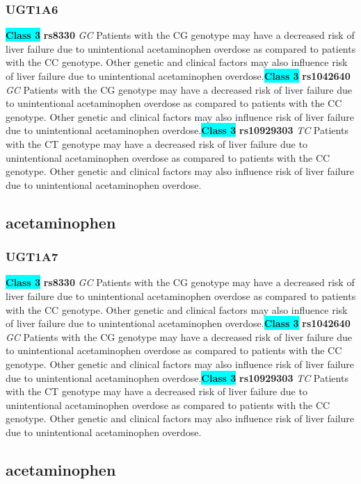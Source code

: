 \documentclass{book}
\begin{document}
\subsubsection{ UGT1A6 }

\begin{center}
\textbf{\colorbox{cyan} {Class 3}} \textbf{ rs8330 } \textit{ GC }
Patients with the CG genotype may have a decreased risk of liver failure due to unintentional acetaminophen overdose as compared to patients with the CC genotype. Other genetic and clinical factors may also influence risk of liver failure due to unintentional acetaminophen overdose.\textbf{\colorbox{cyan} {Class 3}} \textbf{ rs1042640 } \textit{ GC }
Patients with the CG genotype may have a decreased risk of liver failure due to unintentional acetaminophen overdose as compared to patients with the CC genotype. Other genetic and clinical factors may also influence risk of liver failure due to unintentional acetaminophen overdose.\textbf{\colorbox{cyan} {Class 3}} \textbf{ rs10929303 } \textit{ TC }
Patients with the CT genotype may have a decreased risk of liver failure due to unintentional acetaminophen overdose as compared to patients with the CC genotype. Other genetic and clinical factors may also influence risk of liver failure due to unintentional acetaminophen overdose.


\end{center}\subsection{ acetaminophen }


\subsubsection{ UGT1A7 }

\begin{center}
\textbf{\colorbox{cyan} {Class 3}} \textbf{ rs8330 } \textit{ GC }
Patients with the CG genotype may have a decreased risk of liver failure due to unintentional acetaminophen overdose as compared to patients with the CC genotype. Other genetic and clinical factors may also influence risk of liver failure due to unintentional acetaminophen overdose.\textbf{\colorbox{cyan} {Class 3}} \textbf{ rs1042640 } \textit{ GC }
Patients with the CG genotype may have a decreased risk of liver failure due to unintentional acetaminophen overdose as compared to patients with the CC genotype. Other genetic and clinical factors may also influence risk of liver failure due to unintentional acetaminophen overdose.\textbf{\colorbox{cyan} {Class 3}} \textbf{ rs10929303 } \textit{ TC }
Patients with the CT genotype may have a decreased risk of liver failure due to unintentional acetaminophen overdose as compared to patients with the CC genotype. Other genetic and clinical factors may also influence risk of liver failure due to unintentional acetaminophen overdose.


\end{center}\subsection{ acetaminophen }
\end{document}
